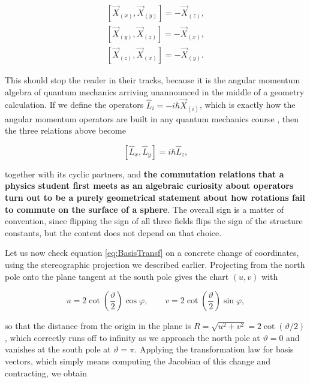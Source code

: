         \begin{align}
            \left[\Vec{X}_{(x)},\Vec{X}_{(y)}\right] = -\Vec{X}_{(z)},\\
            \left[\Vec{X}_{(y)},\Vec{X}_{(z)}\right] = -\Vec{X}_{(x)},\\
            \left[\Vec{X}_{(z)},\Vec{X}_{(x)}\right] = -\Vec{X}_{(y)}.
        \end{align}

        This should stop the reader in their tracks, because it is the angular momentum algebra of quantum mechanics arriving unannounced in the middle of a geometry calculation. If we define the operators $\hat{L}_i = -i\hbar\Vec{X}_{(i)}$, which is exactly how the angular momentum operators are built in any quantum mechanics course \citep{sakurai2011}, then the three relations above become

        \begin{equation}
            \left[\hat{L}_x,\hat{L}_y\right] = i\hbar\hat{L}_z,
        \end{equation}

        together with its cyclic partners, and \textbf{the commutation relations that a physics student first meets as an algebraic curiosity about operators turn out to be a purely geometrical statement about how rotations fail to commute on the surface of a sphere}. The overall sign is a matter of convention, since flipping the sign of all three fields flips the sign of the structure constants, but the content does not depend on that choice.

        Let us now check equation \ref{eq:BasisTransf} on a concrete change of coordinates, using the stereographic projection we described earlier. Projecting from the north pole onto the plane tangent at the south pole gives the chart $(u,v)$ with

        \begin{equation}
            u = 2\cot\left(\frac{\vartheta}{2}\right)\cos\varphi,\qquad v = 2\cot\left(\frac{\vartheta}{2}\right)\sin\varphi,
        \end{equation}

        so that the distance from the origin in the plane is $R = \sqrt{u^2+v^2} = 2\cot(\vartheta/2)$, which correctly runs off to infinity as we approach the north pole at $\vartheta = 0$ and vanishes at the south pole at $\vartheta = \pi$. Applying the transformation law for basis vectors, which simply means computing the Jacobian of this change and contracting, we obtain

